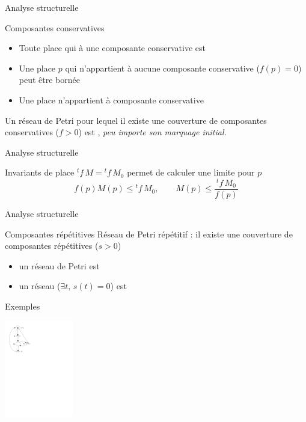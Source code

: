 \documentclass[compress]{beamer}
\begin{document}
\begin{frame}{Analyse structurelle}
\begin{block}{Composantes conservatives}
\begin{itemize}
\item Toute place qui  à une composante conservative  est 
\item Une place $p$ qui n'appartient à aucune composante conservative ($f(p)=0$) peut être bornée
\item Une place  n'appartient à  composante conservative
\end{itemize}
Un réseau de Petri pour lequel il existe une couverture de composantes 
conservatives ($f>0$) est , {\it peu importe son marquage initial.}
\end{block}
\end{frame}  
 
\begin{frame}{Analyse structurelle}
\begin{block}{Invariants de place}
${}^tf \, M = {}^tf \, M_0$ permet de calculer une limite pour  $p$
$$f(p) M(p) \leq {}^tf \, M_0, \qquad M(p) \leq \frac{{}^tf \, M_0}{f(p)}$$
\end{block}
\end{frame}  

\begin{frame}{Analyse structurelle}
\begin{block}{Composantes répétitives}
Réseau de Petri répétitif : il existe une couverture de composantes répétitives ($s>0$)
	\begin{itemize}
	\item un réseau de Petri  est 
	\item un réseau  ($\exists t, \, s(t)=0$) est 
	\end{itemize}
\end{block}
\end{frame}  
   
\begin{frame}{Exemples}
\begin{center}
	\includegraphics[width=3cm]{exemplea} 
\end{center}
\end{frame}      
\end{document}
